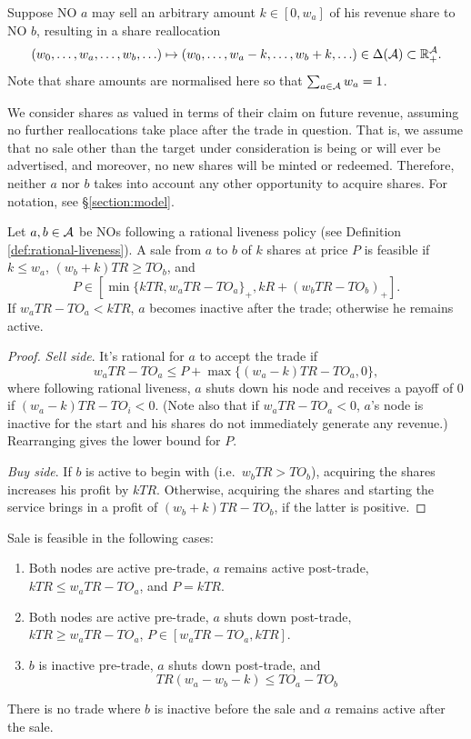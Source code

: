 Suppose NO $a$ may sell an arbitrary amount $k\in[0,w_a]$ of his revenue share to NO $b$, resulting in a share reallocation
\[
  (w_0,\ldots,w_a,\ldots,w_b,\ldots) \mapsto (w_0,\ldots,w_a-k,\ldots,w_b+k,\ldots) \in \Delta(\mathcal{A})\subset\mathbb{R}_+^{\mathcal{A}}.
\]
Note that share amounts are normalised here so that $\sum_{a\in\mathcal{A}}w_a=1$.

We consider shares as valued in terms of their claim on future revenue, assuming no further reallocations take place after the trade in question.
%
That is, we assume that no sale other than the target under consideration is being or will ever be advertised, and moreover, no new shares will be minted or redeemed.
%
Therefore, neither $a$ nor $b$ takes into account any other opportunity to acquire shares.
%
For notation, see \S\ref{section:model}.

\begin{proposition}

  Let $a,b\in\mathcal{A}$ be NOs following a rational liveness policy (see Definition \ref{def:rational-liveness}).
  A sale from $a$ to $b$ of $k$ shares at price $P$ is feasible if $k\leq w_a$, $(w_b+k)TR\geq TO_b$, and
  \[
    P\in [\min\{kTR,w_aTR-TO_a\}_+, kR + (w_bTR-TO_b)_+].
  \]  
  If $w_aTR-TO_a < kTR$, $a$ becomes inactive after the trade; otherwise he remains active.
  
\end{proposition}
%
\begin{proof}

  \emph{Sell side}. It's rational for $a$ to accept the trade if
  \[
      w_a TR - TO_a \leq P + \max\{ (w_a-k) TR - TO_a, 0\},
  \]
  where following rational liveness, $a$ shuts down his node and receives a payoff of $0$ if $(w_a-k)TR-TO_i < 0$.
  (Note also that if $w_aTR-TO_a<0$, $a$'s node is inactive for the start and his shares do not immediately generate any revenue.)
  Rearranging gives the lower bound for $P$.

  \emph{Buy side}. If $b$ is active to begin with (i.e.~$w_bTR>TO_b$), acquiring the shares increases his profit by $kTR$.
  Otherwise, acquiring the shares and starting the service brings in a profit of $(w_b+k)TR-TO_b$, if the latter is positive. \qedhere

\end{proof}

\begin{corollary}

  Sale is feasible in the following cases:
  \begin{enumerate}
    \item Both nodes are active pre-trade, $a$ remains active post-trade, $kTR\leq w_aTR-TO_a$, and $P=kTR$.
    \item Both nodes are active pre-trade, $a$ shuts down post-trade, $kTR\geq w_aTR-TO_a$, $P\in[w_aTR-TO_a,kTR]$.
    \item $b$ is inactive pre-trade, $a$ shuts down post-trade, and \[ TR(w_a-w_b-k) \leq TO_a-TO_b \]
  \end{enumerate}
  There is no trade where $b$ is inactive before the sale and $a$ remains active after the sale.

\end{corollary}

